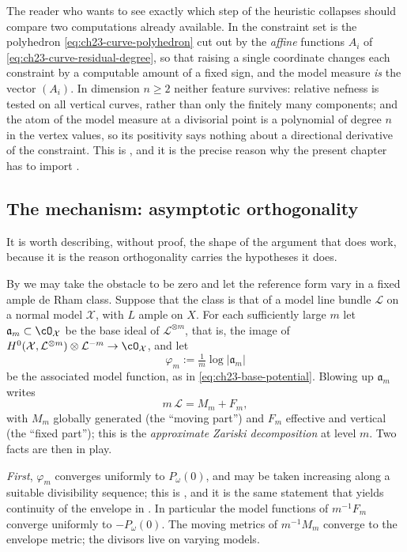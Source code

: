 The reader who wants to see exactly which step of the heuristic collapses
should compare two computations already available.  In
 the constraint set is the
polyhedron \eqref{eq:ch23-curve-polyhedron} cut out by the \emph{affine}
functions $A_i$ of \eqref{eq:ch23-curve-residual-degree}, so that raising a
single coordinate changes each constraint by a computable amount of a fixed
sign, and the model measure \emph{is} the vector $(A_i)$.  In dimension
$n\geq2$ neither feature survives: relative nefness is tested on
all vertical curves, rather than only the finitely many components; and the
atom of the model measure at a divisorial point is a polynomial of degree
$n$ in the vertex values, so its positivity says nothing about a
directional derivative of the constraint.  This is
, and it is the precise reason why the
present chapter has to import .

\subsection{The mechanism: asymptotic orthogonality}
\label{sec:ch27-orthogonality-mechanism}

It is worth describing, without proof, the shape of the argument that does
work, because it is the reason orthogonality carries the hypotheses it
does.

By  we may take the obstacle
to be zero and let the reference form vary in a fixed ample de Rham class.
Suppose that the class is that of a model line bundle $\mathcal L$ on a
normal model $\mathcal X$, with $L$ ample on $X$.  For each sufficiently large $m$
let $\mathfrak a_m\subset\cO_{\mathcal X}$ be the base ideal of
$\mathcal L^{\otimes m}$, that is, the image of
$H^0(\mathcal X,\mathcal L^{\otimes m})\otimes\mathcal L^{-m}
 \to\cO_{\mathcal X}$, and let
\[
 \varphi_m:=\tfrac1m\log|\mathfrak a_m|
\]
be the associated model function, as in
\eqref{eq:ch23-base-potential}.  Blowing up $\mathfrak a_m$ writes
\[
 m\,\mathcal L=M_m+F_m,
\]
with $M_m$ globally generated (the ``moving part'') and $F_m$ effective
and vertical (the ``fixed part''); this is the \emph{approximate Zariski
decomposition} at level $m$.  Two facts are then in play.

\emph{First}, $\varphi_m$ converges uniformly to $P_\omega(0)$, and
may be taken increasing along a suitable divisibility sequence; this is
, and it is the same statement that
yields continuity of the envelope in .  In
particular the model functions of $m^{-1}F_m$ converge uniformly to
$-P_\omega(0)$.  The moving metrics of $m^{-1}M_m$ converge to the
envelope metric; the divisors live on varying models.

